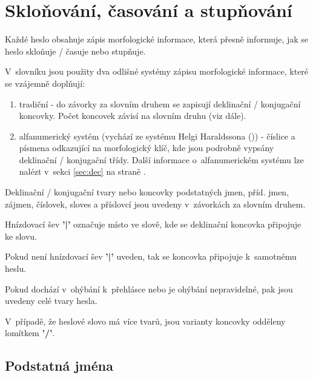 \section{Skloňování, časování a stupňování}

Každé heslo obsahuje zápis morfologické informace, která přesně informuje, jak se heslo skloňuje / časuje nebo stupňuje.

V~slovníku jsou použity dva odlišné systémy zápisu morfologické informace, které se vzájemně doplňují:

\begin{enumerate}
\item tradiční - do závorky za slovním druhem se zapisují deklinační / konjugační koncovky. Počet koncovek závisí na slovním druhu (viz dále).
\item alfanumerický systém (vychází ze systému Helgi Haraldssona (\cite {is6})) - číslice a písmena odkazující na morfologický klíč, kde jsou podrobně vypsány deklinační / konjugační třídy.
Další informace o~alfanumerickém systému lze nalézt v~sekci \ref{sec:dec} na straně \pageref{sec:dec}.
\end{enumerate}

Deklinační / konjugační tvary nebo koncovky podstatných jmen, příd. jmen, zájmen, číslovek, sloves a příslovcí jsou uvedeny v~závorkách za slovním druhem.

Hnízdovací šev \textbf{'|'} označuje místo ve slově, kde se deklinační koncovka připojuje ke slovu.

\blspace
  \dicEntry {}  
\blspace

Pokud není hnízdovací šev \textbf{'|'} uveden, tak se koncovka připojuje k~samotnému heslu.

\blspace
  \dicEntry {}  
\blspace

Pokud dochází v~ohýbání k~přehlásce nebo je ohýbání nepravidelné, pak jsou uvedeny celé tvary hesla.

\blspace
  \dicEntry {}  
\blspace

V~případě, že heslové slovo má více tvarů, jsou varianty koncovky odděleny lomítkem \textbf{'/'}.

\blspace
  \dicEntry {}  
\blspace

\subsection*{Podstatná jména}


